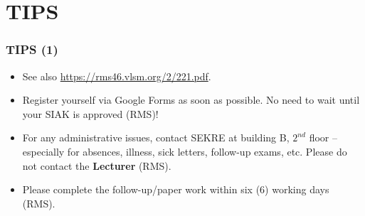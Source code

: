 
\section{TIPS}

\begin{frame}[fragile]
\frametitle{TIPS (1)}

\begin{itemize}

\item See also \url{https://rms46.vlsm.org/2/221.pdf}.

\item Register yourself via Google Forms as soon as possible. 
      No need to wait until your SIAK is approved (RMS)!

\item For any administrative issues, contact SEKRE at building B, $2^{nd}$ floor --
      especially for absences, illness, sick letters, follow-up exams, etc.
      Please do not contact the \textbf{Lecturer} (RMS).

\item Please complete the follow-up/paper work within six (6) working days (RMS).

\end{itemize}

\end{frame}

